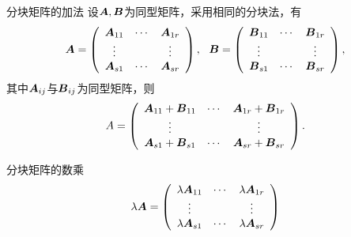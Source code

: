 \begin{frame}
  \begin{footnotesize}
  \begin{block}{分块矩阵的加法}
    设$\boldsymbol{A}, \boldsymbol{B}$为同型矩阵，采用相同的分块法，有
    $$
    \A = \left(
    \begin{array}{ccc}
      \A_{11} & \cd & \A_{1r} \\
      \vd   &     & \vd   \\
      \A_{s1} & \cd & \A_{sr}
    \end{array}
    \right), \ \ 
    \B = \left(
    \begin{array}{ccc}
      \B_{11} & \cd & \B_{1r} \\
      \vd   &     & \vd   \\
      \B_{s1} & \cd & \B_{sr}
    \end{array}
    \right),
    $$
    其中$\boldsymbol{A}_{ij}$与$\boldsymbol{B}_{ij}$为同型矩阵，则
    $$
    A = \left(
    \begin{array}{ccc}
      \boldsymbol{A}_{11} + \boldsymbol{B}_{11}  & \cdots & \boldsymbol{A}_{1r} + \boldsymbol{B}_{1r} \\
      \vdots   &     & \vdots   \\
      \boldsymbol{A}_{s1} + \boldsymbol{B}_{s1}  & \cdots & \boldsymbol{A}_{sr} + \boldsymbol{B}_{sr}
    \end{array}
    \right).
    $$
  \end{block}
    
  \end{footnotesize}

\end{frame}

\begin{frame}

    \begin{block}{分块矩阵的数乘}
            $$
      \lambda \boldsymbol{A} = \left(
      \begin{array}{ccc}
        \lambda \boldsymbol{A}_{11} & \cdots & \lambda \boldsymbol{A}_{1r} \\
        \vdots   &     & \vdots   \\
        \lambda \boldsymbol{A}_{s1} & \cdots & \lambda \boldsymbol{A}_{sr}
      \end{array}
      \right)
      $$    
    \end{block}

\end{frame}


